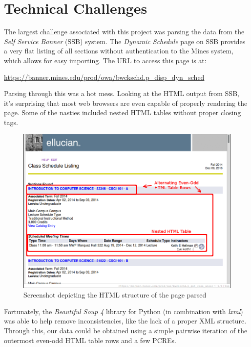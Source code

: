 \documentclass[12pt,letterpaper,titlepage]{article}
\begin{document}
\clearpage

\section{Technical Challenges}

The largest challenge associated with this project was parsing the data from
the \emph{Self Service Banner} (SSB) system. The \emph{Dynamic Schedule} page
on SSB provides a very flat listing of all sections without authentication to
the Mines system, which allows for easy importing. The URL to access this page
is at:

\begin{center}
    \url{https://banner.mines.edu/prod/owa/bwckschd.p_disp_dyn_sched}
\end{center}

Parsing through this was a hot mess. Looking at the HTML output from SSB, it's
surprising that most web browsers are even capable of properly rendering the
page. Some of the nasties included nested HTML tables without proper closing
tags.

\begin{figure}[H]
    \centering
    \includegraphics[width=0.8\linewidth]{bannertbl.png}
    \caption{Screenshot depicting the HTML structure of the page parsed}
\end{figure}

Fortunately, the \emph{Beautiful Soup 4} library for Python (in combination
with \emph{lxml}) was able to help remove inconsistencies, like the lack of a
proper XML structure. Through this, our data could be obtained using a simple
pairwise iteration of the outermost even-odd HTML table rows and a few PCREs.
\end{document}
